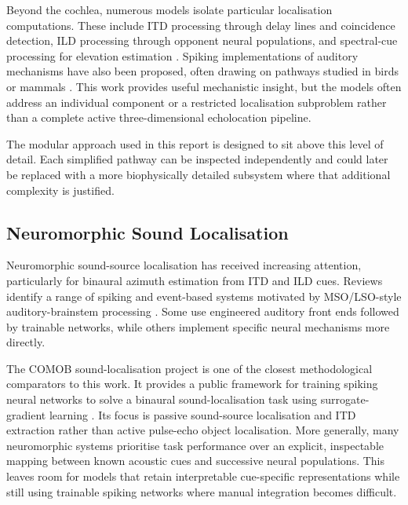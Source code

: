 Beyond the cochlea, numerous models isolate particular localisation computations. These include ITD processing through delay lines and coincidence detection, ILD processing through opponent neural populations, and spectral-cue processing for elevation estimation \cite{Lazar2008FaithfulNeurons,Moro2022NeuromorphicTransducers,Tanveer2021EstimateStudy,OssesVecchiAProcessing}. Spiking implementations of auditory mechanisms have also been proposed, often drawing on pathways studied in birds or mammals \cite{Wall2012SpikingDifference,Goldsworthy2022ComputationalStimulation,Biswas2022ModelingOscillators}. This work provides useful mechanistic insight, but the models often address an individual component or a restricted localisation subproblem rather than a complete active three-dimensional echolocation pipeline.

The modular approach used in this report is designed to sit above this level of detail. Each simplified pathway can be inspected independently and could later be replaced with a more biophysically detailed subsystem where that additional complexity is justified.

\subsection{Neuromorphic Sound Localisation}

Neuromorphic sound-source localisation has received increasing attention, particularly for binaural azimuth estimation from ITD and ILD cues. Reviews identify a range of spiking and event-based systems motivated by MSO/LSO-style auditory-brainstem processing \cite{Danneville2024ASystems}. Some use engineered auditory front ends followed by trainable networks, while others implement specific neural mechanisms more directly.

The COMOB sound-localisation project is one of the closest methodological comparators to this work. It provides a public framework for training spiking neural networks to solve a binaural sound-localisation task using surrogate-gradient learning \cite{SpikingProject}. Its focus is passive sound-source localisation and ITD extraction rather than active pulse-echo object localisation. More generally, many neuromorphic systems prioritise task performance over an explicit, inspectable mapping between known acoustic cues and successive neural populations. This leaves room for models that retain interpretable cue-specific representations while still using trainable spiking networks where manual integration becomes difficult.

